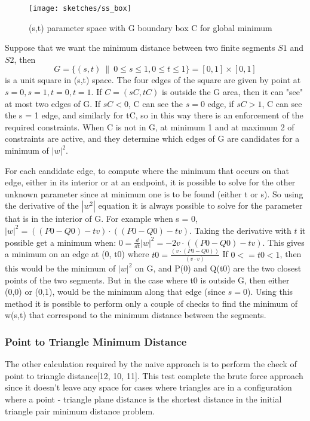 \begin{figure}[!h]
\centering
\texttt{[image: sketches/ss\_box]} \protect\caption{\label{fig9}(s,t) parameter space with G boundary box C for global minimum}
\end{figure} 

Suppose that we want the minimum distance between two finite segments $S1$ and $S2$, then 
$$G=\{ (s,t) \: \| \: 0 \leq s \leq 1, 0 \leq t \leq 1 \} = [0,1]\times[0,1]$$ 
is a unit square in (s,t) space. The four edges of the square are given by point at $s = 0, s = 1, t = 0, t = 1$. If $C = (sC, tC)$ is outside the G area, then it can "see" at most two edges of G. If $sC < 0$, C can see the $s = 0$ edge, if $sC > 1$, C can see the s = 1 edge, and similarly for tC, so in this way there is an enforcement of the required constraints. When C is not in G, at minimum 1 and at maximum 2 of constraints are active, and they determine which edges of G are candidates for a minimum of $|w| ^2$.
 
For each candidate edge, to compute where the minimum that occurs on that edge, either in its interior or at an endpoint, it is possible to solve for the other unknown parameter since at minimum one is to be found (either t or s). So using the derivative of the $|w^2|$ equation it is always possible to solve for the parameter that is in the interior of G. For example when s = 0, $|w|^2 = ((P0-Q0)-tv) \cdot ((P0-Q0)-tv)$. Taking the derivative with $t$ it possible get a minimum when: $0 = \frac{d}{dt}|w|^2 = -2v \cdot ((P0-Q0)-tv)$.
This gives a minimum on an edge at (0, t0) where $t0 = \frac{(v \cdot (P0-Q0))}{(v \cdot v)}$
If $0 <= t0 < 1$, then this would be the minimum of $|w|^2$ on G, and P(0) and Q(t0) are the two closest points of the two segments. But in the case where t0 is outside G, then either (0,0) or (0,1), would be the minimum along that edge (since $s=0$). Using this method it is possible to perform only a couple of checks to find the minimum of w(s,t) that correspond to the minimum distance between the segments.

\subsubsection{Point to Triangle Minimum Distance}
The other calculation required by the naive approach is to perform the check of point to triangle distance[12, 10, 11]. This test complete the brute force approach since it doesn't leave any  space for cases where triangles are in a configuration where a point - triangle plane distance is the shortest distance in the initial triangle pair minimum distance problem. 

